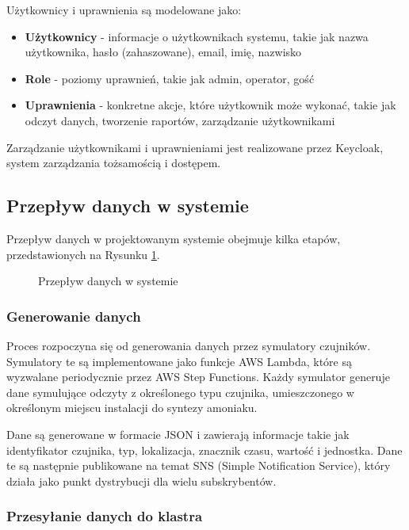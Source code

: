 Użytkownicy i uprawnienia są modelowane jako:

\begin{itemize}
    \item \textbf{Użytkownicy} - informacje o użytkownikach systemu, takie jak nazwa użytkownika, hasło (zahaszowane), email, imię, nazwisko
    \item \textbf{Role} - poziomy uprawnień, takie jak admin, operator, gość
    \item \textbf{Uprawnienia} - konkretne akcje, które użytkownik może wykonać, takie jak odczyt danych, tworzenie raportów, zarządzanie użytkownikami
\end{itemize}

Zarządzanie użytkownikami i uprawnieniami jest realizowane przez Keycloak, system zarządzania tożsamością i dostępem.

\subsection{Przepływ danych w systemie}
\label{subsec:przeplyw_danych}

Przepływ danych w projektowanym systemie obejmuje kilka etapów, przedstawionych na Rysunku \ref{fig:przeplyw_danych}.

\begin{figure}[h]
    \centering
    \caption{Przepływ danych w systemie}
    \label{fig:przeplyw_danych}
\end{figure}

\subsubsection{Generowanie danych}
\label{subsubsec:generowanie_danych}

Proces rozpoczyna się od generowania danych przez symulatory czujników. Symulatory te są implementowane jako funkcje AWS Lambda, które są wyzwalane periodycznie przez AWS Step Functions. Każdy symulator generuje dane symulujące odczyty z określonego typu czujnika, umieszczonego w określonym miejscu instalacji do syntezy amoniaku.

Dane są generowane w formacie JSON i zawierają informacje takie jak identyfikator czujnika, typ, lokalizacja, znacznik czasu, wartość i jednostka. Dane te są następnie publikowane na temat SNS (Simple Notification Service), który działa jako punkt dystrybucji dla wielu subskrybentów.

\subsubsection{Przesyłanie danych do klastra}
\label{subsubsec:przesylanie_danych}

